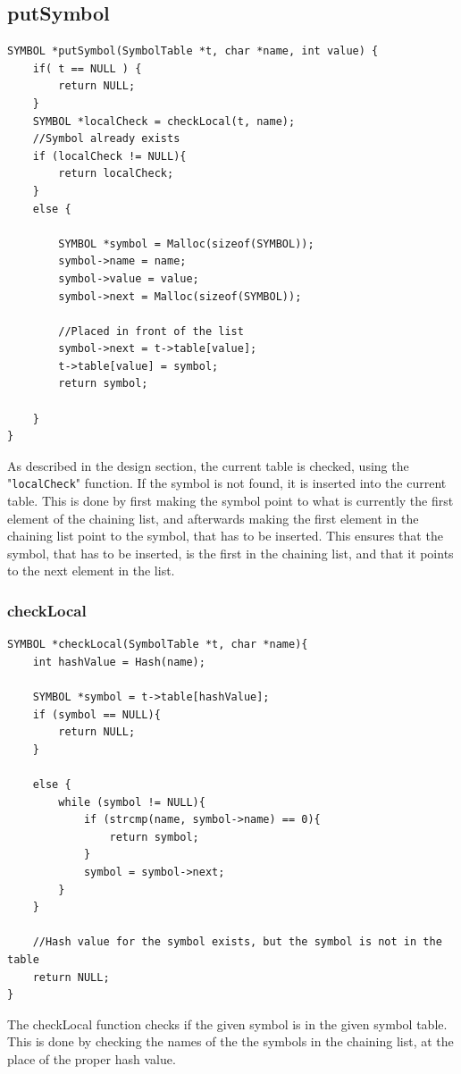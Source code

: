 \documentclass[a4paper,10pt,titlepage]{report}
\begin{document}
\subsection{putSymbol}
\begin{lstlisting}
SYMBOL *putSymbol(SymbolTable *t, char *name, int value) {
    if( t == NULL ) {
        return NULL;
    }
    SYMBOL *localCheck = checkLocal(t, name);
    //Symbol already exists
    if (localCheck != NULL){
        return localCheck;
    }
    else {

        SYMBOL *symbol = Malloc(sizeof(SYMBOL));
        symbol->name = name;
        symbol->value = value;
        symbol->next = Malloc(sizeof(SYMBOL));

        //Placed in front of the list
        symbol->next = t->table[value];
        t->table[value] = symbol;
        return symbol;

    }
}
\end{lstlisting}
As described in the design section, the current table is checked, using the "\verb!localCheck!" function. If the symbol is not found, it is inserted into the current table. This is done by first making the symbol point to what is currently the first element of the chaining list, and afterwards making the first element in the chaining list point to the symbol, that has to be inserted. This ensures that the symbol, that has to be inserted, is the first in the chaining list, and that it points to the next element in the list.

\subsubsection{checkLocal}
\begin{lstlisting}
SYMBOL *checkLocal(SymbolTable *t, char *name){
    int hashValue = Hash(name);
    
    SYMBOL *symbol = t->table[hashValue];
    if (symbol == NULL){
        return NULL;
    }

    else {
        while (symbol != NULL){
            if (strcmp(name, symbol->name) == 0){
                return symbol;
            }
            symbol = symbol->next;
        }
    }

    //Hash value for the symbol exists, but the symbol is not in the table
    return NULL;
}
\end{lstlisting}
The checkLocal function checks if the given symbol is in the given symbol table. This is done by checking the names of the the symbols in the chaining list, at the place of the proper hash value.
\end{document}
